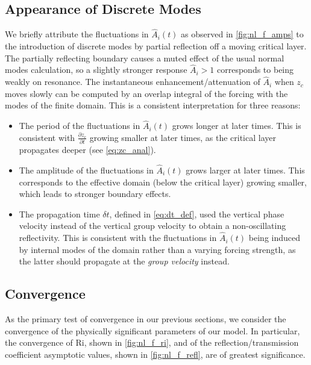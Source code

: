 \documentclass[
        fleqn,
        usenatbib,
    ]{mnras}
\newcommand*{\pd}[2]{\frac{\partial#1}{\partial#2}}
\begin{document}
\subsection{Appearance of Discrete Modes}\label{ss:modes}

We briefly attribute the fluctuations in $\hat{A}_i(t)$ as observed in
\autoref{fig:nl_f_amps} to the introduction of discrete modes by partial
reflection off a moving critical layer. The partially reflecting boundary causes
a muted effect of the usual normal modes calculation, so a slightly stronger
response $\hat{A}_i > 1$ corresponds to being weakly on resonance. The
instantaneous enhancement/attenuation of $\hat{A}_i$ when $z_c$ moves slowly can
be computed by an overlap integral of the forcing with the modes of the finite
domain. This is a consistent interpretation for three reasons:
\begin{itemize}
    \item The period of the fluctuations in $\hat{A}_i(t)$ grows longer at later
        times. This is consistent with $\pd{z_c}{t}$ growing smaller at later
        times, as the critical layer propagates deeper (see
        \autoref{eq:zc_anal}).

    \item The amplitude of the fluctuations in $\hat{A}_i(t)$ grows larger at
        later times. This corresponds to the effective domain (below the
        critical layer) growing smaller, which leads to stronger boundary
        effects.

    \item The propagation time $\delta t$, defined in \autoref{eq:dt_def}, used
        the vertical phase velocity instead of the vertical group velocity to
        obtain a non-oscillating reflectivity. This is consistent with the
        fluctuations in $\hat{A}_i(t)$ being induced by internal modes of the
        domain rather than a varying forcing strength, as the latter should
        propagate at the \emph{group velocity} instead.
\end{itemize}

\subsection{Convergence}\label{ss:convergence}

As the primary test of convergence in our previous sections, we consider the
convergence of the physically significant parameters of our model. In
particular, the convergence of $\mathrm{Ri}$, shown in \autoref{fig:nl_f_ri},
and of the reflection/transmission coefficient asymptotic values, shown in
\autoref{fig:nl_f_refl}, are of greatest significance.
\end{document}
